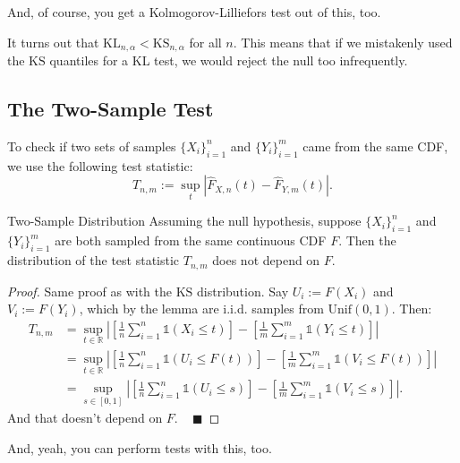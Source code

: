 And, of course, you get a Kolmogorov-Lilliefors test out of this, too.

\begin{remark}
    It turns out that $\mathrm{KL}_{n, \alpha} < \mathrm{KS}_{n, \alpha}$
    for all $n$.
    This means that if we mistakenly used the $\mathrm{KS}$ quantiles
    for a KL test, we would reject the null too infrequently.
\end{remark}

\subsection{The Two-Sample Test}

To check if two sets of samples $\{X_i\}_{i = 1}^n$ and $\{Y_i\}_{i = 1}^m$
came from the same CDF, we use the following test statistic:
\[ T_{n, m} := \sup_t \left| \hat{F}_{X, n}(t) - \hat{F}_{Y, m}(t) \right|. \]

\begin{theorem}{Two-Sample Distribution}
    Assuming the null hypothesis,
    suppose $\{X_i\}_{i = 1}^n$ and $\{Y_i\}_{i = 1}^m$
    are both sampled from the same continuous CDF $F$.
    Then the distribution of the test statistic $T_{n, m}$
    does not depend on $F$.
\end{theorem}

\begin{proof}
    Same proof as with the $\mathrm{KS}$ distribution.
    Say $U_i := F(X_i)$ and $V_i := F(Y_i)$, which by the lemma
    are i.i.d. samples from $\mathrm{Unif}(0, 1)$.  Then:
    \begin{align*}
        T_{n, m} & = \sup_{t \in \mathbb{R}}\left|
            \left[\frac{1}{n}\sum_{i = 1}^n
            \mathds{1}(X_i \leq t)\right] -
            \left[\frac{1}{m}\sum_{i = 1}^m
            \mathds{1}(Y_i \leq t)\right]
        \right| \\
        & = \sup_{t \in \mathbb{R}}\left|
            \left[\frac{1}{n}\sum_{i = 1}^n
            \mathds{1}(U_i \leq F(t))\right] -
            \left[\frac{1}{m}\sum_{i = 1}^m
            \mathds{1}(V_i \leq F(t))\right]
        \right| \\
        & = \sup_{s \in [0, 1]}\left|
            \left[\frac{1}{n}\sum_{i = 1}^n
            \mathds{1}(U_i \leq s)\right] -
            \left[\frac{1}{m}\sum_{i = 1}^m
            \mathds{1}(V_i \leq s)\right]
        \right|.
    \end{align*}
    And that doesn't depend on $F$. ~ $\blacksquare$
\end{proof}

And, yeah, you can perform tests with this, too.

